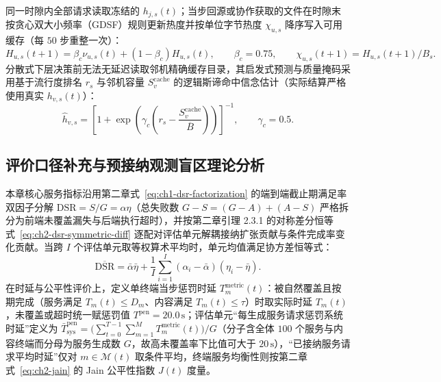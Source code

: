 同一时隙内全部请求读取冻结的 $h_{j,s}(t)$；当步回源或协作获取的文件在时隙末按贪心双大小频率（GDSF）规则更新热度并按单位字节热度 $\chi_{u,s}$ 降序写入可用缓存（每 $50$ 步重整一次）：
\begin{equation}
 H_{u,s}(t+1)=\beta_c\nu_{u,s}(t)+(1-\beta_c)H_{u,s}(t),
 \qquad\beta_c=0.75,\qquad
 \chi_{u,s}(t+1)=H_{u,s}(t+1)/B_s.
 \label{eq:ch3-cache-score}
\end{equation}
分散式下层决策前无法无延迟读取邻机精确缓存目录，其启发式预测与质量掩码采用基于流行度排名 $r_s$ 与邻机容量 $S_v^{\mathrm{cache}}$ 的逻辑斯谛命中信念估计（实际结算严格使用真实 $h_{v,s}(t)$）：
\begin{equation}
 \widehat h_{v,s}=
 \left[1+\exp\left(\gamma_c\left(r_s-\frac{S_v^{\mathrm{cache}}}{\overline B}\right)\right)\right]^{-1},
 \qquad\gamma_c=0.5.
 \label{eq:ch3-cache-belief}
\end{equation}

\subsection{评价口径补充与预接纳观测盲区理论分析}
\label{sec:dsr-decomposition}
\label{sec:denominator-boundary}
\label{sec:fairness-model}

本章核心服务指标沿用第二章式~\eqref{eq:ch1-dsr-factorization} 的端到端截止期满足率双因子分解 $\mathrm{DSR}=S/G=\alpha\eta$（总失败数 $G-S=(G-A)+(A-S)$ 严格拆分为前端未覆盖漏失与后端执行超时），并按第二章引理 2.3.1 的对称差分恒等式~\eqref{eq:ch2-dsr-symmetric-diff} 逐配对评估单元解耦接纳扩张贡献与条件完成率变化贡献。当跨 $I$ 个评估单元取等权算术平均时，单元均值满足协方差恒等式：
\begin{equation}
 \overline{\mathrm{DSR}}
 =\bar\alpha\bar\eta+
 \frac{1}{I}\sum_{i=1}^{I}(\alpha_i-\bar\alpha)(\eta_i-\bar\eta).
 \label{eq:ch3-mean-decomposition}
\end{equation}
在时延与公平性评价上，定义单终端当步惩罚时延 $T_m^{\mathrm{metric}}(t)$：被自然覆盖且按期完成（服务满足 $T_m(t)\leq D_m$、内容满足 $T_m(t)\leq\tau$）时取实际时延 $T_m(t)$，未覆盖或超时统一赋惩罚值 $T^{\mathrm{pen}}=20.0\,\mathrm{s}$；评估单元“每生成服务请求惩罚系统时延”定义为 $\bar{T}_{\mathrm{sys}}^{\mathrm{pen}}=\big(\sum_{t=0}^{T-1}\sum_{m=1}^{M}T_m^{\mathrm{metric}}(t)\big)/G$（分子含全体 $100$ 个服务与内容终端而分母为服务生成数 $G$，故高未覆盖率下比值可大于 $20\,\mathrm{s}$），“已接纳服务请求平均时延”仅对 $m\in\mathcal{M}(t)$ 取条件平均，终端服务均衡性则按第二章式~\eqref{eq:ch2-jain} 的 Jain 公平性指数 $J(t)$ 度量\cite{jain1984quantitative}。

